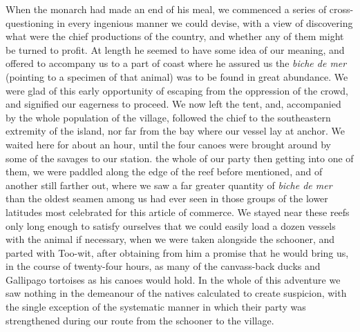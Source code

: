 When the monarch had made an end of his meal, we commenced a series of
cross-questioning in every ingenious manner we could devise, with a view of
discovering what were the chief productions of the country, and whether any of
them might be turned to profit. At length he seemed to have some idea of our
meaning, and offered to accompany us to a part of coast where he assured us the
\emph{biche de mer} (pointing to a specimen of that animal) was to be found in
great abundance. We were glad of this early opportunity of escaping from the
oppression of the crowd, and signified our eagerness to proceed. We now left the
tent, and, accompanied by the whole population of the village, followed the
chief to the southeastern extremity of the island, nor far from the bay where
our vessel lay at anchor. We waited here for about an hour, until the four
canoes were brought around by some of the savages to our station. the whole of
our party then getting into one of them, we were paddled along the edge of the
reef before mentioned, and of another still farther out, where we saw a far
greater quantity of \emph{biche de mer} than the oldest seamen among us had ever
seen in those groups of the lower latitudes most celebrated for this article of
commerce. We stayed near these reefs only long enough to satisfy ourselves that
we could easily load a dozen vessels with the animal if necessary, when we were
taken alongside the schooner, and parted with Too-wit, after obtaining from him
a promise that he would bring us, in the course of twenty-four hours, as many of
the canvass-back ducks and Gallipago tortoises as his canoes would hold. In the
whole of this adventure we saw nothing in the demeanour of the natives
calculated to create suspicion, with the single exception of the systematic
manner in which their party was strengthened during our route from the schooner
to the village. 

